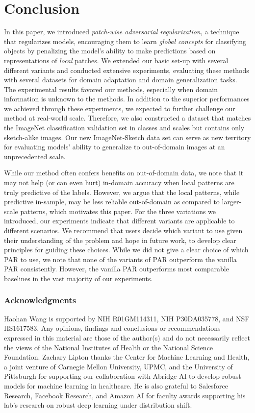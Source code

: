 \documentclass{article}
\begin{document}
\section{Conclusion}

\label{sec:con}
In this paper, we introduced  \emph{patch-wise adversarial regularization},
a technique that regularizes models,
encouraging them to learn \emph{global concepts} for classifying objects 
by penalizing the model's ability to make predictions based on representations of  \emph{local} patches. 
We extended our basic set-up with several different variants and conducted extensive experiments, evaluating these methods with several datasets for domain adaptation and domain generalization tasks. 
The experimental results favored our methods, especially when domain information is unknown to the methods.
In addition to the superior performances we achieved through these experiments, we expected to further challenge our method at real-world scale. 
Therefore, we also constructed a dataset that matches the ImageNet classification validation set in classes and scales but contains only sketch-alike images. 
Our new ImageNet-Sketch data set can serve as new territory for evaluating models' ability to generalize to out-of-domain images at an unprecedented scale.  

\label{sec:diss}
While our method often confers benefits on out-of-domain data, 
we note that it may not help (or can even hurt)
in-domain accuracy
when local patterns are truly predictive of the labels. 
However, we argue that the local patterns,
while predictive in-sample,
may be less reliable out-of-domain as compared to larger-scale patterns, which motivates this paper.
For the three variations we introduced, 
our experiments indicate 
that different variants are applicable to different scenarios. 
We recommend that users decide which variant to use 
given their understanding of the problem
and hope in future work, 
to develop clear principles for guiding these choices.
While we did not give a clear choice of which PAR to use, 
we note that none of the variants of PAR
outperform the vanilla PAR consistently. 
However, the vanilla PAR outperforms most comparable baselines in the vast majority of our experiments.
%
 


\subsubsection*{Acknowledgments}
Haohan Wang is supported by NIH R01GM114311, NIH P30DA035778, and NSF IIS1617583. Any opinions, findings and conclusions or recommendations expressed in this material are those of the author(s) and do not necessarily reflect the views of the National Institutes of Health or the National Science Foundation.
Zachary Lipton thanks the Center for Machine Learning and Health, a joint venture of Carnegie Mellon University, UPMC, and the University of Pittsburgh for supporting our collaboration with Abridge AI to develop robust models for machine learning in healthcare. He is also grateful to Salesforce Research, Facebook Research, and Amazon AI for faculty awards supporting his lab's research on robust deep learning under distribution shift.  
\end{document}
